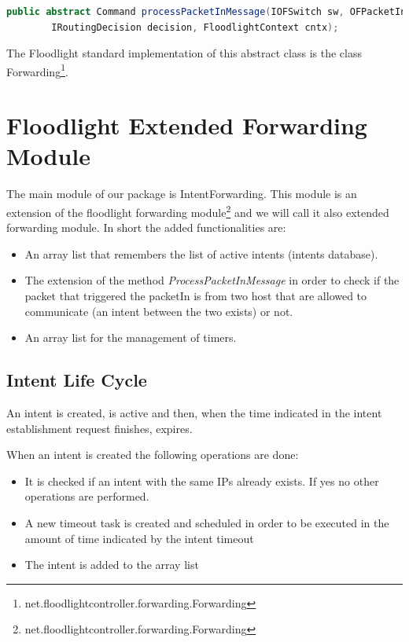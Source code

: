 \documentclass[a4paper]{report}
\begin{document}
	\begin{lstlisting}[language=Java]
		public abstract Command processPacketInMessage(IOFSwitch sw, OFPacketIn pi, 
		IRoutingDecision decision, FloodlightContext cntx);
	\end{lstlisting}
	
	
	\noindent The Floodlight standard implementation of this abstract class is the class Forwarding\footnote{net.floodlightcontroller.forwarding.Forwarding}.
	
	\section{Floodlight Extended Forwarding Module}\label{forwarding}
\noindent The main module of our package is IntentForwarding. This module is an extension of the floodlight  forwarding module\footnote{net.floodlightcontroller.forwarding.Forwarding} and we will call it also extended forwarding module. In short the added functionalities are:

\begin{itemize}
	\item An array list that remembers the list of active intents (intents database).
	\item The extension of the method \textit{ProcessPacketInMessage} in order to check if the packet that triggered the packetIn is from two host that are allowed to communicate (an intent between the two exists) or not. 
	\item An array list for the management of timers.
\end{itemize}


\subsection{Intent Life Cycle}
\noindent An intent is created, is active and then, when the time indicated in the intent establishment request finishes, expires.

\noindent When an intent is created the following operations are done:
\begin{itemize}
	\item It is checked if an intent with the same IPs already exists. If yes no other operations are performed.
	
	\item A new timeout task is created and scheduled in order to be executed in the amount of time indicated by the intent timeout
	
	\item The intent is added to the array list
\end{itemize}
\end{document}
